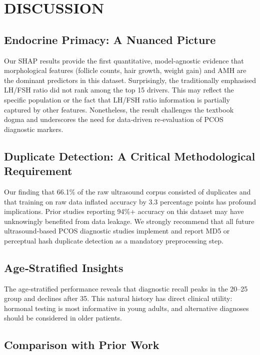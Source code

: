 \documentclass[conference]{IEEEtran}
\begin{document}
\section{DISCUSSION}

\subsection{Endocrine Primacy: A Nuanced Picture}

Our SHAP results provide the first quantitative, model‑agnostic evidence that morphological features (follicle counts, hair growth, weight gain) and AMH are the dominant predictors in this dataset. Surprisingly, the traditionally emphasised LH/FSH ratio did not rank among the top 15 drivers. This may reflect the specific population or the fact that LH/FSH ratio information is partially captured by other features. Nonetheless, the result challenges the textbook dogma and underscores the need for data‑driven re‑evaluation of PCOS diagnostic markers.

\subsection{Duplicate Detection: A Critical Methodological Requirement}

Our finding that 66.1\% of the raw ultrasound corpus consisted of duplicates and that training on raw data inflated accuracy by 3.3 percentage points has profound implications. Prior studies reporting 94\%+ accuracy on this dataset may have unknowingly benefited from data leakage. We strongly recommend that all future ultrasound‑based PCOS diagnostic studies implement and report MD5 or perceptual hash duplicate detection as a mandatory preprocessing step.

\subsection{Age‑Stratified Insights}

The age‑stratified performance reveals that diagnostic recall peaks in the 20–25 group and declines after 35. This natural history has direct clinical utility: hormonal testing is most informative in young adults, and alternative diagnoses should be considered in older patients.

\subsection{Comparison with Prior Work}
\end{document}
